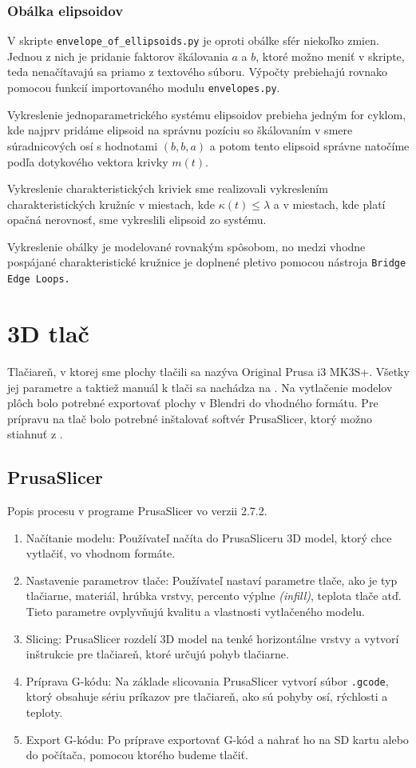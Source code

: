 \subsubsection*{Obálka elipsoidov}
V skripte \verb|envelope_of_ellipsoids.py| je oproti obálke sfér niekoľko zmien. Jednou z nich je pridanie faktorov škálovania $a$ a $b$, ktoré možno meniť v skripte, teda nenačítavajú sa priamo z textového súboru. Výpočty prebiehajú rovnako pomocou funkcií importovaného modulu \verb|envelopes.py|.

Vykreslenie jednoparametrického systému elipsoidov prebieha jedným for cyklom, kde najprv pridáme elipsoid na správnu pozíciu so škálovaním v smere súradnicových osí s hodnotami $(b, b, a)$ a potom tento elipsoid správne natočíme podľa dotykového vektora krivky $m(t).$  

Vykreslenie charakteristických kriviek sme realizovali vykreslením charakteristických kružníc v miestach, kde
$\kappa(t) \leq \lambda$ a v miestach, kde platí opačná nerovnosť, sme vykreslili elipsoid zo systému.

Vykreslenie obálky je modelované rovnakým spôsobom, no medzi vhodne pospájané charakteristické kružnice je doplnené pletivo pomocou nástroja \verb|Bridge Edge Loops.| 

\section{3D tlač}
Tlačiareň, v ktorej sme plochy tlačili sa nazýva Original Prusa i3 MK3S+. Všetky jej parametre a taktiež manuál k tlači sa nachádza na \cite{PrusaManual}. Na vytlačenie modelov plôch bolo potrebné exportovať plochy v Blendri do vhodného formátu. Pre prípravu na tlač bolo potrebné inštalovať softvér PrusaSlicer, ktorý možno stiahnuť z \cite{PrusaSlicer}.
\subsection{PrusaSlicer}
Popis procesu v programe PrusaSlicer vo verzii 2.7.2.
\begin{enumerate}
\item Načítanie modelu: Používateľ načíta do PrusaSliceru 3D model, ktorý chce vytlačiť, vo vhodnom formáte.

\item Nastavenie parametrov tlače: Používateľ nastaví parametre tlače, ako je typ tlačiarne, materiál, hrúbka vrstvy, percento výplne \textit{(infill)}, teplota tlače atď. Tieto parametre ovplyvňujú kvalitu a vlastnosti vytlačeného modelu.

\item Slicing: PrusaSlicer rozdelí 3D model na tenké horizontálne vrstvy a vytvorí inštrukcie pre tlačiareň, ktoré určujú pohyb tlačiarne. 

\item Príprava G-kódu: Na základe slicovania PrusaSlicer vytvorí súbor \verb|.gcode|, ktorý obsahuje sériu príkazov pre tlačiareň, ako sú pohyby osí, rýchlosti a teploty.

\item Export G-kódu: Po príprave exportovať G-kód a nahrať ho na SD kartu alebo do počítača, pomocou ktorého budeme tlačiť.
\end{enumerate}

